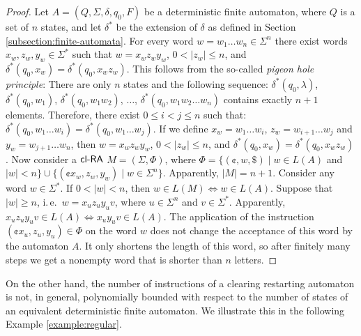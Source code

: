 \begin{proof}
Let $A = (Q, \Sigma, \delta, q_0, F)$ be a deterministic finite automaton, where $Q$ is a set of $n$ states, and let $\delta^*$ be the extension of $\delta$ as defined in Section \ref{subsection:finite-automata}. For every word $w = w_1 \ldots w_n \in \Sigma^n$ there exist words $x_w, z_w, y_w \in \Sigma^*$ such that $w = x_w z_w y_w$, $0 < |z_w| \le n$, and $\delta^*(q_0, x_w) = \delta^*(q_0, x_w z_w)$. This follows from the so-called \emph{pigeon hole principle}: There are only $n$ states and the following sequence: $\delta^*(q_0, \lambda)$, $\delta^*(q_0, w_1)$, $\delta^*(q_0, w_1 w_2)$, $\ldots$, $\delta^*(q_0, w_1 w_2 \ldots w_n)$ contains exactly $n+1$ elements. Therefore, there exist $0 \le i < j \le n$ such that: $\delta^*(q_0, w_1 \ldots w_i) = \delta^*(q_0, w_1 \ldots w_j)$. If we define $x_w = w_1 \ldots w_i$, $z_w = w_{i+1} \ldots w_j$ and $y_w = w_{j+1} \ldots w_n$, then $w = x_w z_w y_w$, $0 < |z_w| \le n$, and $\delta^*(q_0, x_w) = \delta^*(q_0, x_w z_w)$. Now consider a $\textup{\sf cl-RA\/}$ $M = (\Sigma, \Phi)$, where $\Phi = \{ (\cent, w, \$) \mid w \in L(A)$ and $|w| < n\} \cup \{(\cent x_w, z_w, y_w) \mid w \in \Sigma^n\}$. Apparently, $|M| = n + 1$. Consider any word $w \in \Sigma^*$. If $0 < |w| < n$, then $w \in L(M) \Leftrightarrow w \in L(A)$. Suppose that $|w| \ge n$, i.\,e.\ $w = x_u z_u y_u v$, where $u \in \Sigma^n$ and $v \in \Sigma^*$. Apparently, $x_u z_u y_u v \in L(A) \Leftrightarrow x_u y_u v \in L(A)$. The application of the instruction $(\cent x_u, z_u, y_u) \in \Phi$ on the word $w$ does not change the acceptance of this word by the automaton $A$. It only shortens the length of this word, so after finitely many steps we get a nonempty word that is shorter than $n$ letters.
\end{proof}

On the other hand, the number of instructions of a clearing restarting automaton is not, in general, polynomially bounded with respect to the number of states of an equivalent deterministic finite automaton. We illustrate this in the following Example \ref{example:regular}.

